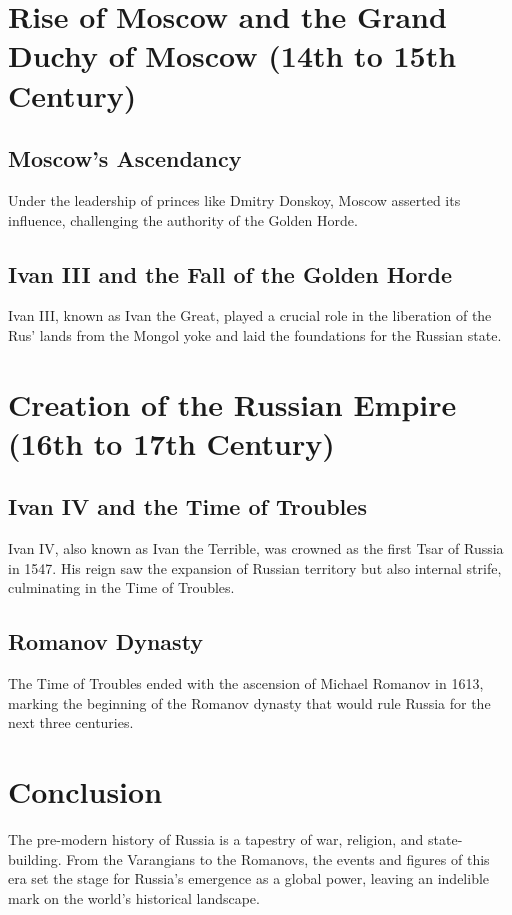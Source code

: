 \documentclass[a4paper,12pt]{book}
\begin{document}
\section{Rise of Moscow and the Grand Duchy of Moscow (14th to 15th Century)}
\label{sec:rise-of-moscow}
\subsection{Moscow’s Ascendancy}
Under the leadership of princes like Dmitry Donskoy, Moscow asserted its influence, challenging the authority of the Golden Horde.

\subsection{Ivan III and the Fall of the Golden Horde}
Ivan III, known as Ivan the Great, played a crucial role in the liberation of the Rus’ lands from the Mongol yoke and laid the foundations for the Russian state.

\section{Creation of the Russian Empire (16th to 17th Century)}
\label{sec:russian-empire}
\subsection{Ivan IV and the Time of Troubles}
Ivan IV, also known as Ivan the Terrible, was crowned as the first Tsar of Russia in 1547. His reign saw the expansion of Russian territory but also internal strife, culminating in the Time of Troubles.

\subsection{Romanov Dynasty}
The Time of Troubles ended with the ascension of Michael Romanov in 1613, marking the beginning of the Romanov dynasty that would rule Russia for the next three centuries.

\section{Conclusion}
\label{sec:conclusion-pre-modern-russia}
The pre-modern history of Russia is a tapestry of war, religion, and state-building. From the Varangians to the Romanovs, the events and figures of this era set the stage for Russia's emergence as a global power, leaving an indelible mark on the world’s historical landscape.
\end{document}
